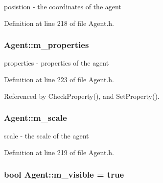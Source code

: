 posistion -\/ the coordinates of the agent 



Definition at line 218 of file Agent.\+h.

\subsubsection[{\texorpdfstring{m\+\_\+properties}{m_properties}}]{ Agent\+::m\+\_\+properties\hspace{0.3cm}{\ttfamily [protected]}}\hypertarget{struct_agent_a323d48d9a1fe0b993aad8700e051d4c4}{}\label{struct_agent_a323d48d9a1fe0b993aad8700e051d4c4}


properties -\/ properties of the agent 



Definition at line 223 of file Agent.\+h.



Referenced by Check\+Property(), and Set\+Property().

\subsubsection[{\texorpdfstring{m\+\_\+scale}{m_scale}}]{ Agent\+::m\+\_\+scale\hspace{0.3cm}{\ttfamily [protected]}}\hypertarget{struct_agent_abc8afe26ba8fbe75eba18ee7ccf45c7e}{}\label{struct_agent_abc8afe26ba8fbe75eba18ee7ccf45c7e}


scale -\/ the scale of the agent 



Definition at line 219 of file Agent.\+h.

\subsubsection[{\texorpdfstring{m\+\_\+visible}{m_visible}}]{\setlength{\rightskip}{0pt plus 5cm}bool Agent\+::m\+\_\+visible = true\hspace{0.3cm}{\ttfamily [protected]}}\hypertarget{struct_agent_a0155e68895c28427071104719d710fc1}{}\label{struct_agent_a0155e68895c28427071104719d710fc1}


